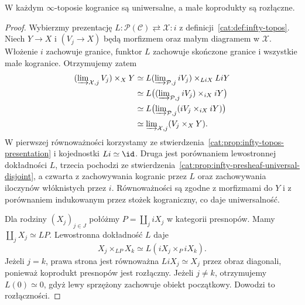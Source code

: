 \begin{twierdzenie}\label{cat:thm:infty-topos-universal-disjoint}
W każdym $\infty$-toposie kogranice są uniwersalne, a małe koprodukty są rozłączne.
\end{twierdzenie}
\begin{proof}
Wybierzmy prezentację $L:\mathcal P(\mathcal C)\rightleftarrows\mathcal X:i$ z definicji~\ref{cat:def:infty-topos}. Niech $Y\to X$ i $(V_j\to X)$ będą morfizmem oraz małym diagramem w $\mathcal X$. Włożenie $i$ zachowuje granice, funktor $L$ zachowuje skończone granice i wszystkie małe kogranice. Otrzymujemy zatem
\[
\begin{aligned}
 (\varinjlim\nolimits_{\mathcal X,j}V_j)\times_XY
 &\simeq L(\varinjlim\nolimits_{\mathcal P,j}iV_j)\times_{LiX}LiY\\
 &\simeq L\bigl((\varinjlim\nolimits_{\mathcal P,j}iV_j)\times_{iX}iY\bigr)\\
 &\simeq L\bigl(\varinjlim\nolimits_{\mathcal P,j}(iV_j\times_{iX}iY)\bigr)\\
 &\simeq\varinjlim\nolimits_{\mathcal X,j}(V_j\times_XY).
\end{aligned}
\]
W pierwszej równoważności korzystamy ze stwierdzenia~\ref{cat:prop:infty-topos-presentation} i kojednostki $Li\simeq\id$. Druga jest porównaniem lewostronnej dokładności $L$, trzecia pochodzi ze stwierdzenia~\ref{cat:prop:infty-presheaf-universal-disjoint}, a czwarta z zachowywania kogranic przez $L$ oraz zachowywania iloczynów włóknistych przez $i$. Równoważności są zgodne z morfizmami do $Y$ i z porównaniem indukowanym przez stożek kograniczny, co daje uniwersalność.

Dla rodziny $(X_j)_{j\in J}$ połóżmy $P=\coprod_j iX_j$ w kategorii presnopów. Mamy $\coprod_j X_j\simeq LP$. Lewostronna dokładność $L$ daje
\[
 X_j\times_{LP}X_k
 \simeq L(iX_j\times_P iX_k).
\]
Jeżeli $j=k$, prawa strona jest równoważna $LiX_j\simeq X_j$ przez obraz diagonali, ponieważ koprodukt presnopów jest rozłączny. Jeżeli $j\neq k$, otrzymujemy $L(0)\simeq0$, gdyż lewy sprzężony zachowuje obiekt początkowy. Dowodzi to rozłączności.
\end{proof}

